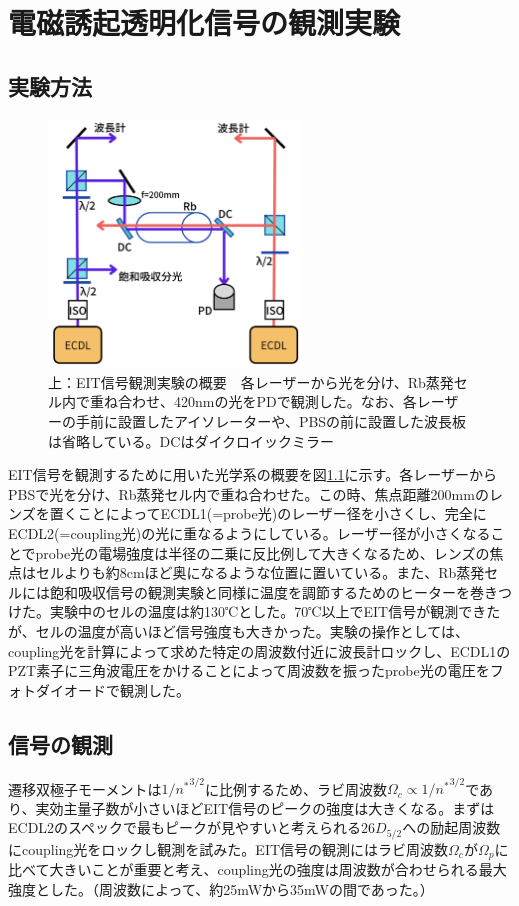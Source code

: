 \documentclass[dvipdfmx]{jsreport}
\begin{document}
\clearpage
\chapter{電磁誘起透明化信号の観測実験}
\section{実験方法}
\begin{figure}
\centering
\includegraphics[width=0.6\textwidth]{images/eit.png}
\caption{\label{fig:eit}上：EIT信号観測実験の概要　各レーザーから光を分け、Rb蒸発セル内で重ね合わせ、420nmの光をPDで観測した。なお、各レーザーの手前に設置したアイソレーターや、PBSの前に設置した波長板は省略している。DCはダイクロイックミラー}
\end{figure}
EIT信号を観測するために用いた光学系の概要を図\ref{fig:eit}に示す。各レーザーからPBSで光を分け、Rb蒸発セル内で重ね合わせた。この時、焦点距離200mmのレンズを置くことによってECDL1(=probe光)のレーザー径を小さくし、完全にECDL2(=coupling光)の光に重なるようにしている。レーザー径が小さくなることでprobe光の電場強度は半径の二乗に反比例して大きくなるため、レンズの焦点はセルよりも約8cmほど奥になるような位置に置いている。また、Rb蒸発セルには飽和吸収信号の観測実験と同様に温度を調節するためのヒーターを巻きつけた。実験中のセルの温度は約130℃とした。70℃以上でEIT信号が観測できたが、セルの温度が高いほど信号強度も大きかった。実験の操作としては、coupling光を計算によって求めた特定の周波数付近に波長計ロックし、ECDL1のPZT素子に三角波電圧をかけることによって周波数を振ったprobe光の電圧をフォトダイオードで観測した。

\section{信号の観測}
遷移双極子モーメントは$1/ {n^*}^{3/2}$に比例するため\cite{yuma}、ラビ周波数$\Omega_c \propto 1/{{n^*}^{3/2}}$であり、実効主量子数が小さいほどEIT信号のピークの強度は大きくなる。まずはECDL2のスペックで最もピークが見やすいと考えられる$26D_{5/2}$への励起周波数にcoupling光をロックし観測を試みた。EIT信号の観測にはラビ周波数$\Omega_c$が$\Omega_p$に比べて大きいことが重要と考え、coupling光の強度は周波数が合わせられる最大強度とした。（周波数によって、約25mWから35mWの間であった。）
\end{document}
